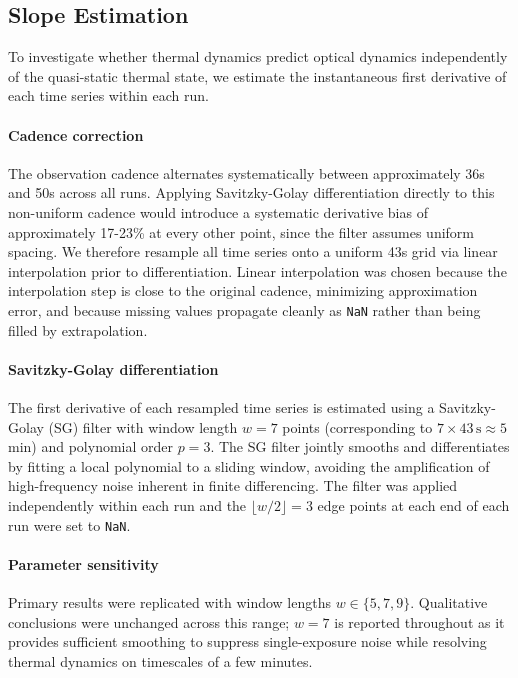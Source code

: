\documentclass[SE,authoryear,toc]{lsstdoc}
\begin{document}
\subsection{Slope Estimation}
\label{slope methods}
To investigate whether thermal dynamics predict optical dynamics independently of the quasi-static thermal state, we estimate the instantaneous first derivative of each time series within each run.
\paragraph{Cadence correction}
The observation cadence alternates systematically between approximately 36s and 50s across all runs. Applying Savitzky-Golay differentiation directly to this non-uniform cadence would introduce a systematic derivative bias of approximately 17-23\% at every other point, since the filter assumes uniform spacing. We therefore resample all time series onto a uniform 43s grid via linear interpolation prior to differentiation. Linear interpolation was chosen because the interpolation step is close to the original cadence, minimizing approximation error, and because missing values propagate cleanly as \texttt{NaN} rather than being filled by extrapolation.
\paragraph{Savitzky-Golay differentiation}
The first derivative of each resampled time series is estimated using a Savitzky-Golay (SG) filter with window length $w = 7$ points (corresponding to $7 \times 43\,\text{s} \approx 5$min) and polynomial order $p = 3$. The SG filter jointly smooths and differentiates by fitting a local polynomial to a sliding window, avoiding the amplification of high-frequency noise inherent in finite differencing. The filter was applied independently within each run and the $\lfloor w/2 \rfloor = 3$ edge points at each end of each run were set to \texttt{NaN}.

\paragraph{Parameter sensitivity}
Primary results were replicated with window lengths $w \in \{5, 7, 9\}$. Qualitative conclusions were unchanged across this range; $w = 7$ is reported throughout as it provides sufficient smoothing to suppress single-exposure noise while resolving thermal dynamics on timescales of a few minutes.


\end{document}
